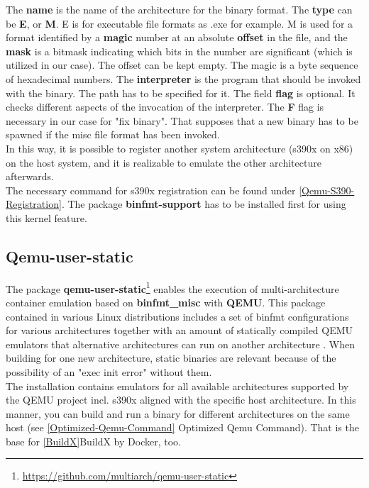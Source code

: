 The \textbf{name} is the name of the architecture for the binary format. The \textbf{type} can be \textbf{E}, or \textbf{M}. E is for executable file formats as .exe for example. M is used for a format identified by a \textbf{magic} number at an absolute \textbf{offset} in the file, and the \textbf{mask} is a bitmask indicating which bits in the number are significant\cite{Slackware2020} (which is utilized in our case). 
The offset can be kept empty. The magic is a byte sequence of hexadecimal numbers. The \textbf{interpreter} is the program that should be invoked with the binary\cite{Guenther2020}. 
The path has to be specified for it. The field \textbf{flag} is optional. It checks different aspects of the invocation of the interpreter. The \textbf{F} flag is necessary in our case for "fix binary". 
That supposes that a new binary has to be spawned if the misc file format has been invoked.\\
In this way, it is possible to register another system architecture (s390x on x86) on the host system, and it is realizable to emulate the other architecture afterwards. \\
The necessary command for s390x registration can be found under \ref{Qemu-S390-Registration}.
The package \textbf{binfmt-support} has to be installed first for using this kernel feature. 

\subsection{Qemu-user-static}\label{qemu-user-static}

The package \textbf{qemu-user-static}\footnote{\url{https://github.com/multiarch/qemu-user-static}} enables the execution of multi-architecture container emulation based on \textbf{binfmt\_misc} with \textbf{QEMU}. This package contained in various Linux distributions includes a set of binfmt configurations for various architectures together with an amount of statically compiled QEMU emulators that alternative architectures can run on another architecture \cite{Yang2019}. When building for one new architecture, static binaries are relevant because of the possibility of an "exec init error" without them. \\
The installation contains emulators for all available architectures supported by the QEMU project incl. s390x aligned with the specific host architecture. In this manner, you can build and run a binary for different architectures on the same host (see \ref{Optimized-Qemu-Command} Optimized Qemu Command). That is the base for \ref{BuildX}BuildX by Docker, too.

